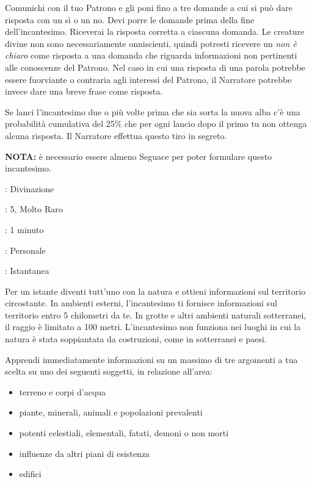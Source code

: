 \begin{multicols}{2}
Comunichi con il tuo Patrono e gli poni fino a tre domande a cui si può dare risposta con un sì o un no. Devi porre le domande prima della fine dell'incantesimo. Riceverai la risposta corretta a ciascuna domanda. Le creature divine non sono necessariamente onniscienti, quindi potresti ricevere un \emph{non è chiaro} come risposta a una domanda che riguarda informazioni non pertinenti alle conoscenze del Patrono. Nel caso in cui una risposta di una parola potrebbe essere fuorviante o contraria agli interessi del Patrono, il Narratore potrebbe invece dare una breve frase come risposta.

Se lanci l'incantesimo due o più volte prima che sia sorta la nuova alba c'è una probabilità cumulativa del 25\% che per ogni lancio dopo il primo tu non ottenga alcuna risposta. Il Narratore effettua questo tiro in segreto.

\textbf{NOTA:} è necessario essere almeno Seguace per poter formulare questo incantesimo.

\noindent\colorbox{OBSSgold!10}{
\begin{minipage}{0.95\linewidth}
\begin{description}[noitemsep, topsep=0pt, parsep=0pt, partopsep=0pt, leftmargin=0cm, labelwidth=1.3cm]
	\item[\textbf{Lista}]: Divinazione
	\item[\textbf{Livello}]: 5, Molto Raro
	\item[\textbf{Lancio}]: 1 minuto
	\item[\textbf{Gittata}]: Personale
	\item[\textbf{Durata}]: Istantanea
\end{description}
\end{minipage}}\smallskip

Per un istante diventi tutt'uno con la natura e ottieni informazioni sul territorio circostante. In ambienti esterni, l'incantesimo ti fornisce informazioni sul territorio entro 5 chilometri da te. In grotte e altri ambienti naturali sotterranei, il raggio è limitato a 100 metri. L'incantesimo non funziona nei luoghi in cui la natura è stata soppiantata da costruzioni, come in sotterranei e paesi.

Apprendi immediatamente informazioni su un massimo di tre argomenti a tua scelta su uno dei seguenti soggetti, in relazione all'area:

\begin{itemize}\setlength{\itemsep}{-1pt}
	\item terreno e corpi d'acqua
	\item piante, minerali, animali e popolazioni prevalenti
	\item potenti celestiali, elementali, fatati, demoni o non morti
	\item influenze da altri piani di esistenza
	\item edifici
\end{itemize}


\end{multicols}
